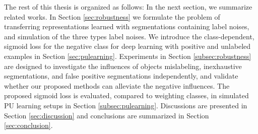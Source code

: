 
The rest of this thesis is organized as follows:
In the next section, we summarize related works.
In Section \ref{sec:robustness} we formulate the problem of transferring representations learned with segmentations containing label noises, and simulation of the three types label noises.
We introduce the class-dependent, sigmoid loss for the negative class for deep learning with positive and unlabeled examples in Section \ref{sec:pulearning}.
Experiments in Section \ref{subsec:robustness} are designed to investigate the influences of objects mislabeling, inexhaustive segmentations, and false positive segmentations independently, and validate whether our proposed methods can alleviate the negative influences.
The proposed sigmoid loss is evaluated, compared to weighting classes, in simulated PU learning setups in Section \ref{subsec:pulearning}.
Discussions are presented in Section \ref{sec:discussion} and conclusions are summarized in Section \ref{sec:conclusion}.
